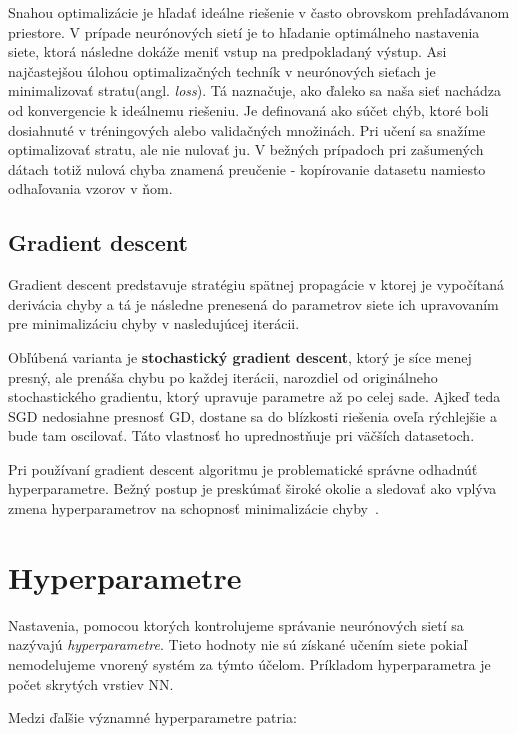 Snahou optimalizácie je hľadať ideálne riešenie v často obrovskom prehľadávanom priestore. V prípade neurónových sietí je to hľadanie optimálneho nastavenia siete, ktorá následne dokáže meniť vstup na predpokladaný výstup. Asi najčastejšou úlohou optimalizačných techník v neurónových sieťach je minimalizovať stratu(angl. \textit{loss}). Tá naznačuje, ako ďaleko sa naša sieť nachádza od konvergencie k ideálnemu riešeniu. Je definovaná ako súčet chýb, ktoré boli dosiahnuté v tréningových alebo validačných množinách. Pri učení sa snažíme optimalizovať stratu, ale nie nulovať ju. V bežných prípadoch pri zašumených dátach totiž nulová chyba znamená preučenie - kopírovanie datasetu namiesto odhaľovania vzorov v ňom.

\subsection{Gradient descent}
\label{stochastic_gradient_descent}

Gradient descent predstavuje stratégiu spätnej propagácie v ktorej je vypočítaná derivácia chyby a tá je následne prenesená do parametrov siete ich upravovaním pre minimalizáciu chyby v nasledujúcej iterácii. 

Obľúbená varianta je \textbf{stochastický gradient descent}, ktorý je síce menej presný, ale prenáša chybu po každej iterácii, narozdiel od originálneho stochastického gradientu, ktorý upravuje parametre až po celej sade. Ajkeď teda SGD nedosiahne presnosť GD, dostane sa do blízkosti riešenia oveľa rýchlejšie a bude tam oscilovať. Táto vlastnosť ho uprednostňuje pri väčších datasetoch.

Pri používaní gradient descent algoritmu je problematické správne odhadnúť hyperparametre. Bežný postup je preskúmať široké okolie a sledovať ako vplýva zmena hyperparametrov na schopnosť minimalizácie chyby~\cite{zhang2004solving}.


\section{Hyperparametre}
\label{analyza_hyperparametre}

Nastavenia, pomocou ktorých kontrolujeme správanie neurónových sietí sa nazývajú \textit{hyperparametre}. Tieto hodnoty nie sú získané učením siete pokiaľ nemodelujeme vnorený systém za týmto účelom. Príkladom hyperparametra je počet skrytých vrstiev NN. 

 Medzi ďaľšie významné hyperparametre patria:
 
